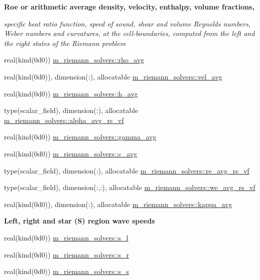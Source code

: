 \begin{Indent}\textbf{ Roe or arithmetic average density, velocity, enthalpy, volume fractions,}\par
{\em specific heat ratio function, speed of sound, shear and volume Reynolds numbers, Weber numbers and curvatures, at the cell-\/boundaries, computed from the left and the right states of the Riemann problem }\begin{DoxyCompactItemize}
\item 
real(kind(0d0)) \hyperlink{namespacem__riemann__solvers_a09cb56d16d4e4c5300be1ceee6e15acf}{m\+\_\+riemann\+\_\+solvers\+::rho\+\_\+avg}
\item 
real(kind(0d0)), dimension(\+:), allocatable \hyperlink{namespacem__riemann__solvers_a0fd22ed964af8ed09333c72744f561bd}{m\+\_\+riemann\+\_\+solvers\+::vel\+\_\+avg}
\item 
real(kind(0d0)) \hyperlink{namespacem__riemann__solvers_abff32786a11d3a71828b4e30d26773fb}{m\+\_\+riemann\+\_\+solvers\+::h\+\_\+avg}
\item 
type(scalar\+\_\+field), dimension(\+:), allocatable \hyperlink{namespacem__riemann__solvers_ac459ed9a3a6c08d8032f3e06ccf96885}{m\+\_\+riemann\+\_\+solvers\+::alpha\+\_\+avg\+\_\+rs\+\_\+vf}
\item 
real(kind(0d0)) \hyperlink{namespacem__riemann__solvers_a122bd2abb655fffd36e070fa376c131d}{m\+\_\+riemann\+\_\+solvers\+::gamma\+\_\+avg}
\item 
real(kind(0d0)) \hyperlink{namespacem__riemann__solvers_a2739a94dffd4557f28f432f86aff6c45}{m\+\_\+riemann\+\_\+solvers\+::c\+\_\+avg}
\item 
type(scalar\+\_\+field), dimension(\+:), allocatable \hyperlink{namespacem__riemann__solvers_ada8ab10b02113187113eed8f49f1ed2d}{m\+\_\+riemann\+\_\+solvers\+::re\+\_\+avg\+\_\+rs\+\_\+vf}
\item 
type(scalar\+\_\+field), dimension(\+:,\+:), allocatable \hyperlink{namespacem__riemann__solvers_a298482aa3e595dfe2401920ad841eb8f}{m\+\_\+riemann\+\_\+solvers\+::we\+\_\+avg\+\_\+rs\+\_\+vf}
\item 
real(kind(0d0)), dimension(\+:), allocatable \hyperlink{namespacem__riemann__solvers_aa6e6b00985be177b0a4a92f1aed48629}{m\+\_\+riemann\+\_\+solvers\+::kappa\+\_\+avg}
\end{DoxyCompactItemize}
\end{Indent}
\begin{Indent}\textbf{ Left, right and star (S) region wave speeds}\par
\begin{DoxyCompactItemize}
\item 
real(kind(0d0)) \hyperlink{namespacem__riemann__solvers_a83a70908c66bbb071647bb383dc72975}{m\+\_\+riemann\+\_\+solvers\+::s\+\_\+l}
\item 
real(kind(0d0)) \hyperlink{namespacem__riemann__solvers_ac5cbbc98622cdafe56142b26d67ad2d9}{m\+\_\+riemann\+\_\+solvers\+::s\+\_\+r}
\item 
real(kind(0d0)) \hyperlink{namespacem__riemann__solvers_a576586da8d3d80052a335d379001059a}{m\+\_\+riemann\+\_\+solvers\+::s\+\_\+s}
\end{DoxyCompactItemize}
\end{Indent}
